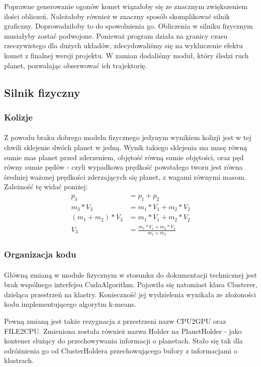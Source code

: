 Poprawne generowanie ogonów komet wiązałoby się ze znacznym zwiększeniem ilości obliczeń. Należałoby również w znaczny sposób skomplikować silnik graficzny. Doprowadziłoby to do spowolnienia go. Obliczenia w silniku fizycznym musiałyby zostać podwojone. Ponieważ program działa na granicy czasu rzeczywistego dla dużych układów, zdecydowaliśmy się na wykluczenie efektu komet z finalnej wersji projektu. W zamian dodaliśmy moduł, który śledzi ruch planet, pozwalając obserwować ich trajektorię.

\subsection{Silnik fizyczny}\label{sub:silnik fizyczny}
\subsubsection{Kolizje}
\paragraph{}

Z powodu braku dobrego modelu fizycznego jedynym wynikiem kolizji jest w tej chwili sklejenie dwóch planet w jedną. Wynik takiego sklejenia ma masę równą sumie mas planet przed zderzeniem, objętość równą sumie objętości, oraz pęd równy sumie pędów - czyli wypadkowa prędkość powstałego tworu jest równa średniej ważonej prędkości zderzających się planet, z wagami równymi masom. Zależność tę widać poniżej:
\begin{align}
p_3 & = p_1 + p_2 \\
m_3 * V_3 & = m_1 * V_1 + m_2 * V_2 \\
( m_1 + m_2 ) * V_3 & = m_1 * V_1 + m_2 * V_2 \\
V_3 & = \frac{ m_1 * V_1 + m_2 * V_2 }{ m_1 + m_2 }
\end{align}

\subsubsection{Organizacja kodu}

\paragraph{}

Główną zmianą w module fizycznym w stosunku do dokumentacji technicznej jest brak wspólnego interfejsu CudaAlgorithm. Pojawiła się natomiast klasa Clusterer, dzieląca przestrzeń na klastry. Konieczność jej wydzielenia wynikała ze złożoności kodu implementującego algorytm k-means.

Pewną zmianą jest także rezygnacja z przestrzeni nazw CPU2GPU oraz FILE2CPU. Zmieniona została również nazwa Holder na PlanetHolder - jako kontener służący do przechowywania informacji o planetach. Stało się tak dla odróżnienia go od ClusterHoldera przechowującego bufory z informacjami o klastrach.



